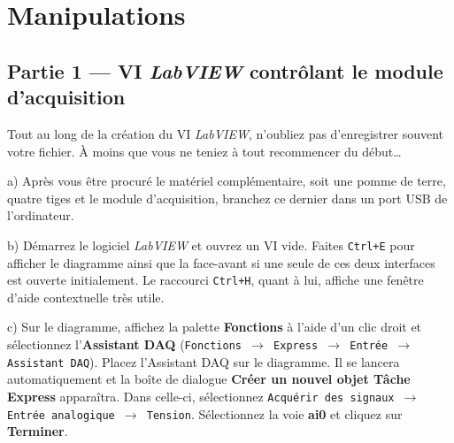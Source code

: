 \documentclass[canadien,12pt,oneside,letterpaper]{article}
\begin{document}
\section{Manipulations} \label{sec:manip}

\setlength{\parskip}{1ex plus 0.5ex minus 0.2ex}




\subsection{Partie 1 --- VI \textit{LabVIEW} contrôlant le module d'acquisition}

Tout au long de la création du VI \textit{LabVIEW}, n'oubliez pas d'enregistrer souvent votre fichier. À moins que vous ne teniez à tout recommencer du début\dots

a) Après vous être procuré le matériel complémentaire, soit une pomme de terre, quatre tiges et le module d'acquisition, branchez ce dernier dans un port USB de l'ordinateur.

b) Démarrez le logiciel \textit{LabVIEW} et ouvrez un VI vide. Faites \texttt{Ctrl+E} pour afficher le diagramme ainsi que la face-avant si une seule de ces deux interfaces est ouverte initialement. Le raccourci \texttt{Ctrl+H}, quant à lui, affiche une fenêtre d'aide contextuelle très utile.

c) Sur le diagramme, affichez la palette \textbf{Fonctions} à l'aide d'un clic droit et sélectionnez l'\textbf{Assistant DAQ} (\texttt{Fonctions $\rightarrow$ Express $\rightarrow$ Entrée $\rightarrow$ Assistant DAQ}). Placez l'Assistant DAQ sur le diagramme. Il se lancera automatiquement et la boîte de dialogue \textbf{Créer un nouvel objet Tâche Express} apparaîtra. Dans celle-ci, sélectionnez \texttt{Acquérir des signaux $\rightarrow$ Entrée analogique $\rightarrow$ Tension}. Sélectionnez la voie \textbf{ai0} et cliquez sur \textbf{Terminer}.
\end{document}
